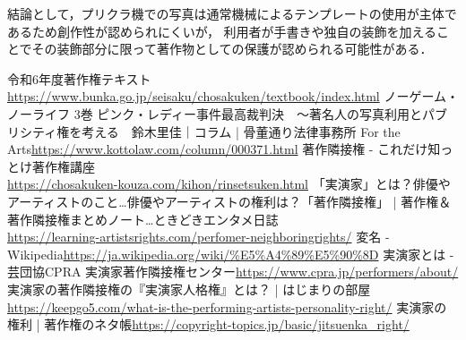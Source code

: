 \documentclass[titlepage,a4paper]{jsarticle}
\begin{document}
結論として，プリクラ機での写真は通常機械によるテンプレートの使用が主体であるため創作性が認められにくいが，
利用者が手書きや独自の装飾を加えることでその装飾部分に限って著作物としての保護が認められる可能性がある．

\newpage
\begin{thebibliography}{99}
  令和6年度著作権テキスト\url{https://www.bunka.go.jp/seisaku/chosakuken/textbook/index.html}
  ノーゲーム・ノーライフ 3巻
  ピンク・レディー事件最高裁判決　～著名人の写真利用とパブリシティ権を考える　鈴木里佳｜コラム | 骨董通り法律事務所 For the Arts\url{https://www.kottolaw.com/column/000371.html}
  著作隣接権 - これだけ知っとけ著作権講座\\\url{https://chosakuken-kouza.com/kihon/rinsetsuken.html}
  「実演家」とは？俳優やアーティストのこと…俳優やアーティストの権利は？「著作隣接権」 | 著作権＆著作隣接権まとめノート…ときどきエンタメ日誌\\
  \url{https://learning-artistsrights.com/perfomer-neighboringrights/}
  変名 - Wikipedia\url{https://ja.wikipedia.org/wiki/%E5%A4%89%E5%90%8D}
  実演家とは - 芸団協CPRA 実演家著作隣接権センター\url{https://www.cpra.jp/performers/about/}
  実演家の著作隣接権の『実演家人格権』とは？ | はじまりの部屋\url{https://keepgo5.com/what-is-the-performing-artists-personality-right/}
  実演家の権利 | 著作権のネタ帳\url{https://copyright-topics.jp/basic/jitsuenka_right/}
\end{thebibliography}
\end{document}

